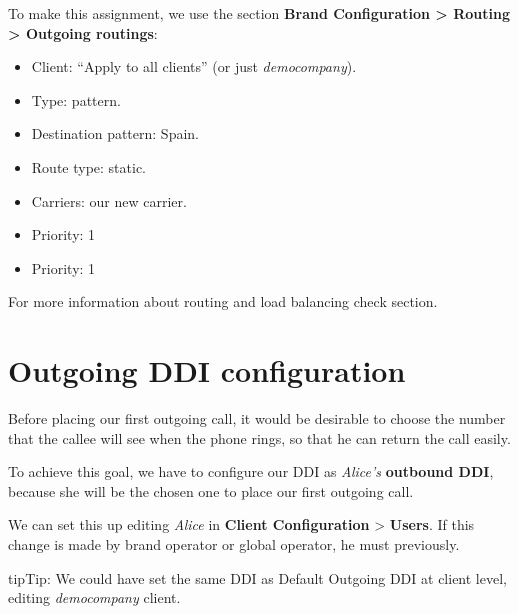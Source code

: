 \documentclass[letterpaper,10pt,english]{sphinxmanual}
\begin{document}
To make this assignment, we use the section \textbf{Brand Configuration \textgreater{} Routing \textgreater{} Outgoing routings}:
\begin{itemize}
\item {} 
Client: ``Apply to all clients'' (or just \emph{democompany}).

\item {} 
Type: pattern.

\item {} 
Destination pattern: Spain.

\item {} 
Route type: static.

\item {} 
Carriers: our new carrier.

\item {} 
Priority: 1

\item {} 
Priority: 1

\end{itemize}

For more information about routing and load balancing check {\hyperref[administration_portal/brand/routing/outgoing_routings:outgoing\string-routings]{}} section.


\section{Outgoing DDI configuration}
\label{getting_started/external_outgoing_calls/outgoing_ddi:external-ddi}\label{getting_started/external_outgoing_calls/outgoing_ddi::doc}\label{getting_started/external_outgoing_calls/outgoing_ddi:outgoing-ddi-configuration}
Before placing our first outgoing call, it would be desirable to choose the
number that the callee will see when the phone rings, so that he can return the
call easily.

To achieve this goal, we have to configure our DDI as \emph{Alice's} \textbf{outbound DDI},
because she will be the chosen one to place our first outgoing call.

We can set this up editing \emph{Alice} in \textbf{Client Configuration} \textgreater{} \textbf{Users}. If
this change is made by brand operator or global operator, he must {\hyperref[getting_started/internal_calls/brand_portal:emulate\string-client]{}} previously.

\begin{notice}{tip}{Tip:}
We could have set the same DDI as Default Outgoing DDI at client level, editing \emph{democompany} client.
\end{notice}
\end{document}

